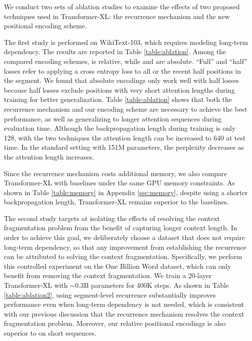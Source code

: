 We conduct two sets of ablation studies to examine the effects of two proposed techniques used in Transformer-XL: the recurrence mechanism and the new positional encoding scheme.


The first study is performed on WikiText-103, which requires modeling long-term dependency.
The results are reported in Table \ref{table:ablation}.
Among the compared encoding schemes, \citet{shaw2018self} is relative, while \citet{vaswani2017attention} and \citet{al2018character} are absolute. ``Full'' and ``half'' losses refer to applying a cross entropy loss to all or the recent half positions in the segment.
We found that absolute encodings only work well with half losses because half losses exclude positions with very short attention lengths during training for better generalization.
Table \ref{table:ablation} shows that both the recurrence mechanism and our encoding scheme are necessary to achieve the best performance, as well as generalizing to longer attention sequences during evaluation time. Although the backpropagation length during training is only 128, with the two techniques the attention length can be increased to 640 at test time. In the standard setting with 151M parameters, the perplexity decreases as the attention length increases.

Since the recurrence mechanism costs additional memory, we also compare Transformer-XL with baselines under the same GPU memory constraints. As shown in Table \ref{table:memory} in Appendix \ref{sec:memory}, despite using a shorter backpropagation length, Transformer-XL remains superior to the baselines.

The second study targets at isolating the effects of resolving the context fragmentation problem from the benefit of capturing longer context length.
In order to achieve this goal, we deliberately choose a dataset that does not require long-term dependency, so that any improvement from establishing the recurrence can be attributed to solving the context fragmentation.
Specifically, we perform this controlled experiment on the One Billion Word dataset, which can only benefit from removing the context fragmentation. We train a 20-layer Transformer-XL with $\sim$0.3B parameters for 400K steps.
As shown in Table \ref{table:ablation2}, using segment-level recurrence substantially improves performance even when long-term dependency is not needed, which is consistent with our previous discussion that the recurrence mechanism resolves the context fragmentation problem. Moreover, our relative positional encodings is also superior to \citet{shaw2018self} on short sequences.


